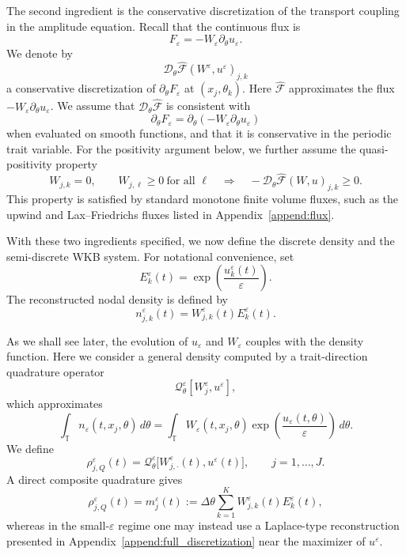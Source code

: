 \documentclass[11pt, dina4, amsfont12]{article}
\begin{document}
The second ingredient is the conservative discretization of the transport
coupling in the amplitude equation. Recall that the continuous flux is
\[
F_\varepsilon=-W_\varepsilon\partial_\theta u_\varepsilon .
\]
We denote by
\[
\mathcal D_\theta\widehat{\mathcal F}(W^\varepsilon,u^\varepsilon)_{j,k}
\]
a conservative discretization of \(\partial_\theta F_\varepsilon\) at
\((x_j,\theta_k)\). Here \(\widehat{\mathcal F}\) approximates the flux
\(-W_\varepsilon\partial_\theta u_\varepsilon\). We assume that
\(\mathcal D_\theta\widehat{\mathcal F}\) is consistent with
\[
\partial_\theta F_\varepsilon
=
\partial_\theta(-W_\varepsilon\partial_\theta u_\varepsilon)
\]
when evaluated on smooth functions, and that it is conservative in the
periodic trait variable. For the positivity argument below, we further assume
the quasi-positivity property
\begin{equation}\label{ass:H_flux}
W_{j,k}=0,
\qquad
W_{j,\ell}\ge0\ \text{for all }\ell
\quad\Longrightarrow\quad
-\mathcal D_\theta\widehat{\mathcal F}(W,u)_{j,k}\ge0 .
\end{equation}
This property is satisfied by standard monotone finite volume fluxes, such as
the upwind and Lax--Friedrichs fluxes listed in Appendix~\ref{append:flux}.

With these two ingredients specified, we now define the discrete density and
the semi-discrete WKB system. For notational convenience, set
\begin{equation}\label{def:E}
E_k^\varepsilon(t)
=
\exp\!\left(\frac{u_k^\varepsilon(t)}{\varepsilon}\right).
\end{equation}
The reconstructed nodal density is defined by
\begin{equation}\label{def:n_reconstructed}
n_{j,k}^\varepsilon(t)
=
W_{j,k}^\varepsilon(t)E_k^\varepsilon(t).
\end{equation}


As we shall see later, the evolution of $u_\varepsilon$ and $W_\varepsilon$ 
couples with the density function. 
Here we consider a general density computed by a
trait-direction quadrature operator
\[
\mathcal Q_\theta^\varepsilon[W_j^\varepsilon,u^\varepsilon],
\]
which approximates
\[
\int_{\mathbb T}
n_\varepsilon(t,x_j,\theta)
\,d\theta 
=
\int_{\mathbb T}
W_\varepsilon(t,x_j,\theta)
\exp\!\left(\frac{u_\varepsilon(t,\theta)}{\varepsilon}\right)
\,d\theta .
\]
We define
\begin{equation}\label{eq:E_rho}
\rho_{j,Q}^\varepsilon(t)
=
\mathcal Q_\theta^\varepsilon
\bigl[W_{j,\cdot}^\varepsilon(t),u^\varepsilon(t)\bigr],
\qquad
j=1,\dots,J .
\end{equation}
A direct composite quadrature gives
\begin{equation} \label{def:m}
\rho_{j,Q}^\varepsilon(t)
=
m_j^\varepsilon(t)
:=
\Delta\theta
\sum_{k=1}^K
W_{j,k}^\varepsilon(t)E_k^\varepsilon(t),
\end{equation}
whereas in the small-\(\varepsilon\) regime one may instead use a
Laplace-type reconstruction presented in
Appendix~\ref{append:full_discretization} near the maximizer of
\(u^\varepsilon\).
\end{document}
